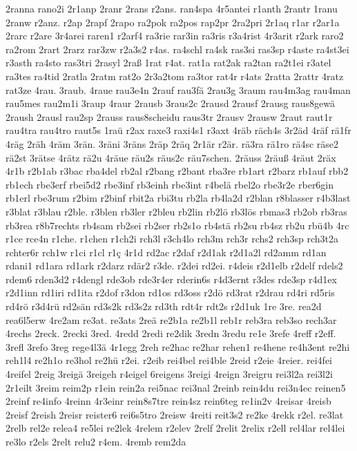 {2ranna
rano2i
2r1anp
2ranr
2rans
r2ans.
ran4spa
4r5antei
r1anth
2rantr
1ranu
2ranw
r2anz.
r2ap
2rapf
2rapo
ra2pok
ra2pos
rap2pr
2ra2pri
2r1aq
r1ar
r2ar1a
2rarc
r2are
3r4arei
raren1
r2arf4
ra3rie
rar3in
ra3ris
r3a4rist
4r3arit
r2ark
raro2
ra2rom
2rart
2rarz
rar3zw
r2a3s2
r4as.
ra4schl
ra4sk
ras3si
ras3sp
r4aste
ra4st3ei
r3asth
ra4sto
ras3tri
2rasyl
2raß
1rat
r4at.
rat1a
rat2ak
ra2tan
ra2t1ei
r3atel
ra3tes
ra4tid
2ratla
2ratm
rat2o
2r3a2tom
ra3tor
rat4r
r4ats
2ratta
2rattr
4ratz
rat3ze
4rau.
3raub.
4raue
rau3e4n
2rauf
rau3fä
2rau3g
3raum
rau4m3ag
rau4man
rau5mes
rau2m1i
3raup
4raur
2rausb
3raus2c
2rausd
2rausf
2rausg
raus8gewä
2raush
2rausl
rau2sp
2rauss
raus8scheidu
raus3tr
2rausv
2rausw
2raut
raut1r
rau4tra
rau4tro
raut5s
1raü
r2ax
raxe3
raxi4s1
r3axt
4räb
räch4s
3r2äd
4räf
rä1fr
4räg
2räh
4räm
3rän.
3räni
3räns
2räp
2räq
2r1är
r2är.
rä3ra
rä1ro
rä4sc
räse2
rä2st
3rätse
4rätz
rä2u
4räue
räu2s
räus2c
räu7schen.
2räuss
2räuß
4räut
2räx
4r1b
r2b1ab
r3bac
rba4del
rb2al
r2bang
r2bant
rba3re
rb1art
r2barz
rb1auf
rbb2
rb1ech
rbe3erf
rbei5d2
rbe3inf
rb3einh
rbe3int
r4belä
rbel2o
rbe3r2e
rber6gin
rb1erl
rbe3rum
r2bim
r2binf
rbit2a
rbi3tu
rb2la
rb4la2d
r2blan
r8blasser
r4b3last
r3blat
r3blau
r2ble.
r3blen
rb3ler
r2bleu
rb2lin
rb2lö
rb3lös
rbmas3
rb2ob
rb3ras
rb3rea
r8b7rechts
rb4sam
rb2sei
rb2ser
rb2s1o
rb4stä
rb2su
rb4sz
rb2u
rbü4b
4rc
r1ce
rce4n
r1che.
r1chen
r1ch2i
rch3l
r3ch4lo
rch3m
rch3r
rchs2
rch3sp
rch3t2a
rchter6r
rch1w
r1ci
r1cl
r1ç
4r1d
rd2ac
r2daf
r2d1ak
r2d1a2l
rd2amm
rd1an
rdani1
rd1ara
rd1ark
r2darz
rdär2
r3de.
r2dei
rd2ei.
r4deis
r2d1elb
r2delf
rdels2
rdem6
rden3d2
r4dengl
rde3ob
rde3r4er
rderin6s
r4d3ernt
r3des
rde3sp
r4d1ex
r2d1inn
rd1iri
rd1ita
r2dof
r3don
rd1os
rd3oss
r2dö
rd3rat
r2drau
rd4ri
rd5ris
rd4rö
r3d4rü
rd2sän
rd3s2k
rd3s2z
rd3th
rdt4r
rdt2s
r2d1uk
1re
3re.
rea2d
rea6l5erw
4re2am
re3at.
re3ats
2reä
re2b1a
re2b1l
reb1r
reb3ra
reb3so
rech3ar
4rechs
2reck.
2recki
3red.
4redd
2redi
re2dik
3redn
3redu
re1e
3refe
4reff
r2eff.
3refl
3refo
3reg
rege4l3ä
4r1egg
2reh
re2hac
re2har
rehen1
re4hene
re4h3ent
re2hi
reh1l4
re2h1o
re3hol
re2hü
r2ei.
r2eib
rei4bel
rei4ble
2reid
r2eie
4reier.
rei4fei
4reifel
2reig
3reigä
3reigeh
r4eigel
6reigens
3reigi
4reign
3reigru
rei3l2a
rei3l2i
2r1eilt
3reim
reim2p
r1ein
rein2a
rei5nac
rei3nal
2reinb
rein4du
rei3n4ec
reinen5
2reinf
re4info
4reinn
4r3einr
rein8s7tre
rein4sz
rein6teg
re1in2v
4reisar
4reisb
2reisf
2reish
2reisr
reister6
rei6s5tro
2reisw
4reiti
reit3s2
re2ke
4rekk
r2el.
re3lat
2relb
rel2e
relea4
re5lei
re2lek
4relem
r2elev
2relf
2relit
2relix
r2ell
rel4lar
rel4lei
re3lo
r2els
2relt
relu2
r4em.
4remb
rem2da
}
